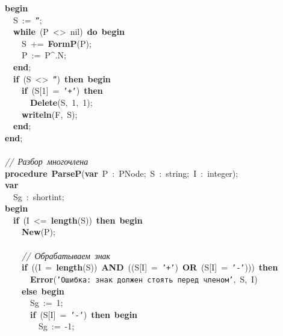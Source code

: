 \mbox{}\textbf{begin} \\
\mbox{}\ \ S\ :=\ \texttt{''}; \\
\mbox{}\ \ \textbf{while}\ (P\ \textless{}\textgreater{}\ nil)\ \textbf{do}\ \textbf{begin} \\
\mbox{}\ \ \ \ S\ +=\ \textbf{FormP}(P); \\
\mbox{}\ \ \ \ P\ :=\ P\textasciicircum{}.N; \\
\mbox{}\ \ \textbf{end}; \\
\mbox{}\ \ \textbf{if}\ (S\ \textless{}\textgreater{}\ \texttt{''})\ \textbf{then}\ \textbf{begin} \\
\mbox{}\ \ \ \ \textbf{if}\ (S[1]\ =\ \texttt{'+'})\ \textbf{then} \\
\mbox{}\ \ \ \ \ \ \textbf{Delete}(S,\ 1,\ 1); \\
\mbox{}\ \ \ \ \textbf{writeln}(F,\ S); \\
\mbox{}\ \ \textbf{end}; \\
\mbox{}\textbf{end}; \\
\mbox{} \\
\mbox{}\textit{//\ Разбор\ многочлена} \\
\mbox{}\textbf{procedure}\ \textbf{ParseP}(\textbf{var}\ P\ :\ PNode;\ S\ :\ string;\ I\ :\ integer); \\
\mbox{}\textbf{var} \\
\mbox{}\ \ Sg\ :\ shortint; \\
\mbox{}\textbf{begin} \\
\mbox{}\ \ \textbf{if}\ (I\ \textless{}=\ \textbf{length}(S))\ \textbf{then}\ \textbf{begin} \\
\mbox{}\ \ \ \ \textbf{New}(P); \\
\mbox{} \\
\mbox{}\ \ \ \ \textit{//\ Обрабатываем\ знак} \\
\mbox{}\ \ \ \ \textbf{if}\ ((I\ =\ \textbf{length}(S))\ \textbf{AND}\ ((S[I]\ =\ \texttt{'+'})\ \textbf{OR}\ (S[I]\ =\ \texttt{'-'})))\ \textbf{then} \\
\mbox{}\ \ \ \ \ \ \textbf{Error}(\texttt{'Ошибка:\ знак\ должен\ стоять\ перед\ членом'},\ S,\ I) \\
\mbox{}\ \ \ \ \textbf{else}\ \textbf{begin} \\
\mbox{}\ \ \ \ \ \ Sg\ :=\ 1; \\
\mbox{}\ \ \ \ \ \ \textbf{if}\ (S[I]\ =\ \texttt{'-'})\ \textbf{then}\ \textbf{begin} \\
\mbox{}\ \ \ \ \ \ \ \ Sg\ :=\ -1; \\
